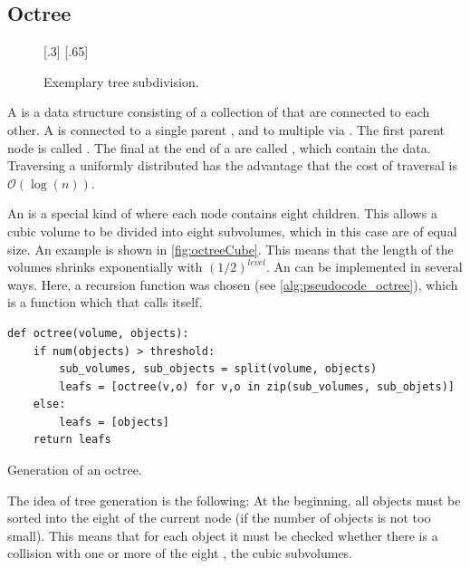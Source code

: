 \subsection{Octree}\label{sec:octree}
%
\begin{figure}[!t]
    \centering
    [.3\textwidth]{
    \def\tikzheight{0.6\textwidth}
    }
    \hfill
    [.65\textwidth]{
    \def\tikzheight{0.6\textwidth}
    }
	\caption{Exemplary tree subdivision.}
	\label{fig:octree}
\end{figure}
%
A  is a data structure consisting of a collection of  that are connected to each other.
A  is connected to a single parent , and to multiple  via .
The first parent node is called .
The final  at the end of a  are called , which contain the data.
Traversing a uniformly distributed  has the advantage that the cost of traversal is $\mathcal{O}(\log(n))$.
\par
%
An  is a special kind of  where each node contains eight children.
This allows a cubic volume to be divided into eight subvolumes, which in this case are of equal size.
An example is shown in \cref{fig:octreeCube}.
This means that the length of the volumes shrinks exponentially with $(1/2)^\mathit{level}$.
An  can be implemented in several ways.
Here, a recursion function was chosen (see \cref{alg:pseudocode_octree}), which is a function which that calls itself.
%
\begin{lstfloat}[!tb]
\lstset{style=python}
\begin{lstlisting}[]
def octree(volume, objects):
    if num(objects) > threshold:
        sub_volumes, sub_objects = split(volume, objects)
        leafs = [octree(v,o) for v,o in zip(sub_volumes, sub_objets)]
    else:
        leafs = [objects]
    return leafs
\end{lstlisting}
\caption{Generation of an octree.}
\label{alg:pseudocode_octree}
\end{lstfloat}
%
The idea of tree generation is the following:
At the beginning, all objects must be sorted into the eight  of the current node (if the number of objects is not too small).
This means that for each object it must be checked whether there is a collision with one or more of the eight , \ie{} the cubic subvolumes.
